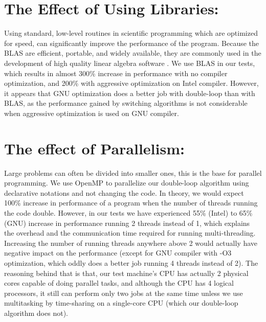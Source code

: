 \documentclass[a4paper,11pt]{article}
\begin{document}
\section{\large The Effect of Using Libraries:}
Using standard, low-level routines in scientific programming which are optimized for speed, can significantly improve the performance of the program. Because the BLAS are efficient, portable, and widely available, they are commonly used in the development of high quality linear algebra software \cite{blas}. We use BLAS in our tests, which results in almost 300\% increase in performance with no compiler optimization, and 200\% with aggressive optimization on Intel compiler. However, it appears that GNU optimization does a better job with double-loop than with BLAS, as the performance gained by switching algorithms is not considerable when aggressive optimization is used on GNU compiler. \\


\section{\large The effect of Parallelism:}
Large problems can often be divided into smaller ones, this is the base for parallel programming. We use OpenMP to parallelize our double-loop algorithm using declarative notations and not changing the code. In theory, we would expect 100\% increase in performance of a program when the number of threads running the code double. However, in our tests we have experienced 55\% (Intel) to 65\% (GNU) increase in performance running 2 threads instead of 1, which explains the overhead and the communication time required for running multi-threading. Increasing the number of running threads anywhere above 2 would actually have negative impact on the performance (except for GNU compiler with -O3 optimization, which oddly does a better job running 4 threads instead of 2). The reasoning behind that is that, our test machine's CPU has actually 2 physical cores capable of doing parallel tasks, and although the CPU has 4 logical processors, it still can perform only two jobs at the same time unless we use multitasking by time-sharing on a single-core CPU (which our double-loop algorithm does not).
\end{document}
